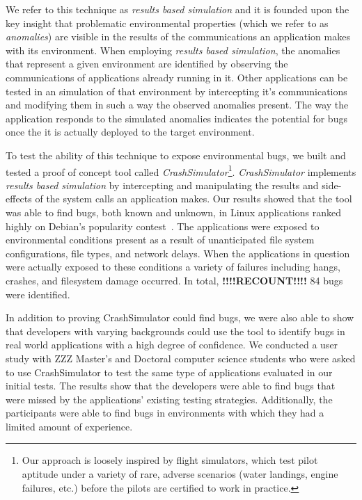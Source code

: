 We refer to this technique as \textit{results based simulation}
and it is founded upon the key insight
that problematic environmental properties
(which we refer to as \textit{anomalies})
are visible in the results of the communications
an application makes with its environment.
When employing \textit{results based simulation},
the anomalies that represent a given environment
are identified by
observing the communications of applications already running in it.
Other applications can be tested in an simulation of that environment
by intercepting it's communications
and modifying them in such a way
the observed anomalies present.
The way the application responds to the simulated anomalies
indicates the potential for bugs once the it is actually deployed
to the target environment.

To test the ability of this technique to expose environmental
bugs, we built and tested a proof of concept tool
called {\em CrashSimulator}\footnote{Our approach is
loosely inspired by flight simulators, which test pilot aptitude under a
variety of rare, adverse scenarios (water landings, engine failures, etc.)
before the pilots are certified to work in practice.}.
{\em CrashSimulator} implements \textit{results based simulation}
by intercepting and manipulating the results and side-effects
of the system calls an application makes.
Our results showed that the tool was able to find bugs,
both known and unknown,
in Linux applications ranked highly on Debian's popularity
contest~\cite{DebPopCon}.  The applications were exposed to
environmental conditions present as a result of unanticipated
file system configurations, file types, and network delays.
When the applications in
question were actually exposed to these conditions a variety of failures
including hangs, crashes, and filesystem damage occurred.  In total,
\textbf{!!!!RECOUNT!!!!} 84
bugs were identified.

In addition to proving CrashSimulator could find bugs, we were also able to
show that developers with varying backgrounds
could use the tool to identify bugs
in real world applications
with a high degree of confidence.
We conducted a user study with
ZZZ Master's and Doctoral computer science students
who were asked to use CrashSimulator to test
the same type of applications evaluated in our initial tests.
The results show that the developers were able to find bugs
that were missed by the applications' existing testing strategies.
Additionally, the
participants were able to find bugs
in environments with which they had a limited amount of experience.

